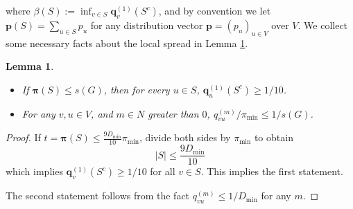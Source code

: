 \documentclass{article}
\newcommand{\set}[1]{\left\{#1\right\}}
\newcommand{\abs}[1]{\left \lvert #1 \right \rvert}
\newcommand{\1}{\mathbf{1}}
\newcommand{\pbf}{\mathbf{p}}
\newcommand{\qbf}{\mathbf{q}}
\newcommand{\pibf}{\bm{\pi}}
\theoremstyle{aldenthm}
\newtheorem{lemma}{Lemma}
\begin{document}
where $\beta(S) := \inf_{v \in S} \qbf_{v}^{(1)}(S^c)$, and by convention we let $\pbf(S) = \sum_{u \in S} p_u$ for any distribution vector $\pbf = (p_u)_{u \in V}$ over $V$. We collect some necessary facts about the local spread in Lemma \ref{lem: local_spread_G}.
\begin{lemma}
	\label{lem: local_spread_G}
	\begin{itemize}
		\item If $\pibf(S) \leq s(G)$, then for every $u \in S$, $\qbf_u^{(1)}(S^c) \geq 1/10$.
		\item For any $v, u \in V$, and $m \in N$ greater than $0$, $q_{vu}^{(m)}/ \pi_{\min} \leq 1/s(G)$.
	\end{itemize}
	
\end{lemma}

\begin{proof}
	If $t = \pibf(S) \leq \frac{9 D_{\min}}{10} \pi_{\min}$, divide both sides by $\pi_{\min}$ to obtain
	\begin{equation*}
	\abs{S} \leq \frac{9 D_{\min}}{10}
	\end{equation*}
	which implies $\qbf_{v}^{(1)}(S^c) \geq 1/10$ for all $v \in S$. This implies the first statement.
	
	The second statement follows from the fact $q_{vu}^{(m)} \leq 1/D_{\min}$ for any $m$.
\end{proof}
\end{document}
